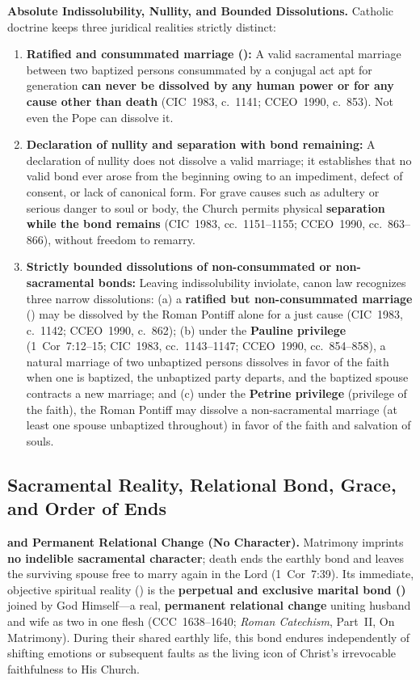 \textbf{Absolute Indissolubility, Nullity, and Bounded Dissolutions.} Catholic doctrine keeps three juridical realities strictly distinct:
\begin{enumerate}
  \item \textbf{Ratified and consummated marriage ():} A valid sacramental marriage between two baptized persons consummated by a conjugal act apt for generation \textbf{can never be dissolved by any human power or for any cause other than death} (CIC~1983, c.~1141; CCEO~1990, c.~853). Not even the Pope can dissolve it.
  \item \textbf{Declaration of nullity and separation with bond remaining:} A declaration of nullity does not dissolve a valid marriage; it establishes that no valid bond ever arose from the beginning owing to an impediment, defect of consent, or lack of canonical form. For grave causes such as adultery or serious danger to soul or body, the Church permits physical \textbf{separation while the bond remains} (CIC~1983, cc.~1151--1155; CCEO~1990, cc.~863--866), without freedom to remarry.
  \item \textbf{Strictly bounded dissolutions of non-consummated or non-sacramental bonds:} Leaving  indissolubility inviolate, canon law recognizes three narrow dissolutions: (a) a \textbf{ratified but non-consummated marriage} () may be dissolved by the Roman Pontiff alone for a just cause (CIC~1983, c.~1142; CCEO~1990, c.~862); (b) under the \textbf{Pauline privilege} (1~Cor~7:12--15; CIC~1983, cc.~1143--1147; CCEO~1990, cc.~854--858), a natural marriage of two unbaptized persons dissolves in favor of the faith when one is baptized, the unbaptized party departs, and the baptized spouse contracts a new marriage; and (c) under the \textbf{Petrine privilege} (privilege of the faith), the Roman Pontiff may dissolve a non-sacramental marriage (at least one spouse unbaptized throughout) in favor of the faith and salvation of souls.
\end{enumerate}

\subsection{Sacramental Reality, Relational Bond, Grace, and Order of Ends}
\label{subsec:matrimony-effects}

\textbf{ and Permanent Relational Change (No Character).} Matrimony imprints \textbf{no indelible sacramental character}; death ends the earthly bond and leaves the surviving spouse free to marry again in the Lord (1~Cor~7:39). Its immediate, objective spiritual reality () is the \textbf{perpetual and exclusive marital bond ()} joined by God Himself---a real, \textbf{permanent relational change} uniting husband and wife as two in one flesh (CCC~1638--1640; \emph{Roman Catechism}, Part~II, On Matrimony). During their shared earthly life, this bond endures independently of shifting emotions or subsequent faults as the living icon of Christ's irrevocable faithfulness to His Church.

